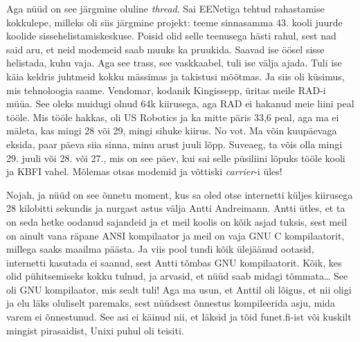Aga nüüd on see järgmine oluline \emph{thread}. Sai EENetiga tehtud rahastamise kokkulepe, milleks oli siis järgmine projekt: teeme sinnasamma 43. kooli juurde koolide sissehelistamiskeskuse. Poisid olid selle teenusega hästi rahul, sest nad said aru, et neid modemeid saab muuks ka pruukida. Saavad ise öösel sisse helistada, kuhu vaja. Aga see trass, see vaskkaabel, tuli ise välja ajada. Tuli ise käia keldris juhtmeid kokku mässimas ja takistusi mõõtmas. Ja siis oli küsimus, mis tehnoloogia saame. Vendomar, kodanik Kingissepp, üritas meile RAD-i müüa. See oleks muidugi olnud 64k kiirusega, aga RAD ei hakanud meie liini peal tööle. Mis tööle hakkas, oli US Robotics ja ka mitte päris 33,6 peal, aga ma ei mäleta, kas mingi 28 või 29, mingi sihuke kiirus. No vot. Ma võin kuupäevaga eksida, paar päeva siia sinna, minu arust juuli lõpp. Suveaeg, ta võis olla mingi 29. juuli või 28. või 27., mis on see päev, kui sai selle püsiliini  lõpuks tööle kooli ja KBFI vahel. Mõlemas otsas modemid ja võttiski \emph{carrier}-i üles! 

Nojah, ja nüüd on see õnnetu moment, kus sa oled otse internetti küljes kiirusega 28 kilobitti sekundis ja nurgast astus välja Antti Andreimann. Antti ütles, et ta on seda hetke oodanud sajandeid ja et meil koolis on kõik asjad tuksis, sest meil on ainult vana räpane ANSI kompilaator ja meil on vaja GNU C kompilaatorit, millega saaks maailma päästa. Ja viis pool tundi kõik ülejäänud ootasid, internetti kasutada ei saanud, sest Antti tõmbas GNU kompilaatorit. Kõik, kes olid pühitsemiseks kokku tulnud, ja arvasid, et nüüd saab midagi tõmmata\ldots {} See oli GNU kompilaator, mis sealt tuli! Aga ma usun, et Anttil oli lõigus, et  nii oligi ja elu läks oluliselt paremaks, sest nüüdsest õnnestus kompileerida asju, mida varem ei õnnestunud. See asi ei käinud nii, et läksid ja tõid funet.fi-ist või kuskilt mingist pirasaidist, Unixi puhul oli teisiti. 

